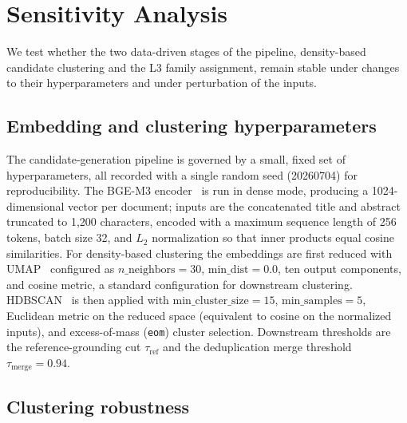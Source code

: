 \documentclass[11pt]{article}
\begin{document}
\section{Sensitivity Analysis}

We test whether the two data-driven stages of the pipeline, density-based candidate clustering and the L3 family assignment, remain stable under changes to their hyperparameters and under perturbation of the inputs.

\subsection*{Embedding and clustering hyperparameters}

The candidate-generation pipeline is governed by a small, fixed set of hyperparameters, all recorded with a single random seed (20260704) for reproducibility. The BGE-M3 encoder~\cite{chen2024bgem3} is run in dense mode, producing a 1024-dimensional vector per document; inputs are the concatenated title and abstract truncated to 1{,}200 characters, encoded with a maximum sequence length of 256 tokens, batch size 32, and \(L_2\) normalization so that inner products equal cosine similarities. For density-based clustering the embeddings are first reduced with UMAP~\cite{umap2018} configured as \(n\_\mathrm{neighbors}=30\), \(\mathrm{min\_dist}=0.0\), ten output components, and cosine metric, a standard configuration for downstream clustering. HDBSCAN~\cite{campello2013,hdbscan2017} is then applied with \(\mathrm{min\_cluster\_size}=15\), \(\mathrm{min\_samples}=5\), Euclidean metric on the reduced space (equivalent to cosine on the normalized inputs), and excess-of-mass (\texttt{eom}) cluster selection. Downstream thresholds are the reference-grounding cut \(\tau_{\mathrm{ref}}\) and the deduplication merge threshold \(\tau_{\mathrm{merge}}=0.94\).

\subsection*{Clustering robustness}
\end{document}
